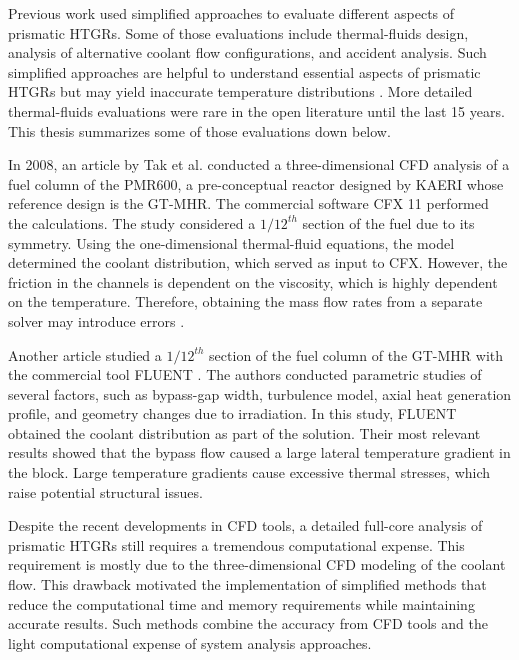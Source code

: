 Previous work used simplified approaches to evaluate different aspects of prismatic HTGRs.
Some of those evaluations include thermal-fluids design, analysis of alternative coolant flow configurations, and accident analysis.
Such simplified approaches are helpful to understand essential aspects of prismatic HTGRs but may yield inaccurate temperature distributions \cite{tak_numerical_2008}.
More detailed thermal-fluids evaluations were rare in the open literature until the last 15 years.
This thesis summarizes some of those evaluations down below.

In 2008, an article by Tak et al. \cite{tak_numerical_2008} conducted a three-dimensional CFD analysis of a fuel column of the PMR600, a pre-conceptual reactor designed by \gls{KAERI} whose reference design is the GT-MHR.
The commercial software CFX 11 \cite{ansys_incorporated_cfx_2006} performed the calculations.
The study considered a $1/12^{th}$ section of the fuel due to its symmetry.
Using the one-dimensional thermal-fluid equations, the model determined the coolant distribution, which served as input to CFX.
However, the friction in the channels is dependent on the viscosity, which is highly dependent on the temperature.
Therefore, obtaining the mass flow rates from a separate solver may introduce errors \cite{sato_computational_2010}.

Another article \cite{sato_computational_2010} studied a $1/12^{th}$ section of the fuel column of the GT-MHR with the commercial tool FLUENT \cite{fluent_inc_fluent_2006}.
The authors conducted parametric studies of several factors, such as bypass-gap width, turbulence model, axial heat generation profile, and geometry changes due to irradiation.
In this study, FLUENT obtained the coolant distribution as part of the solution.
Their most relevant results showed that the bypass flow caused a large lateral temperature gradient in the block.
Large temperature gradients cause excessive thermal stresses, which raise potential structural issues.

Despite the recent developments in CFD tools, a detailed full-core analysis of prismatic HTGRs still requires a tremendous computational expense.
This requirement is mostly due to the three-dimensional CFD modeling of the coolant flow.
This drawback motivated the implementation of simplified methods that reduce the computational time and memory requirements while maintaining accurate results.
Such methods combine the accuracy from CFD tools and the light computational expense of system analysis approaches.

